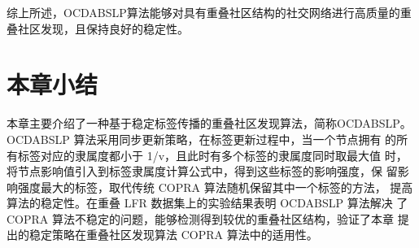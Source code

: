 综上所述，OCDABSLP算法能够对具有重叠社区结构的社交网络进行高质量的重叠社区发现，且保持良好的稳定性。







\section{本章小结}
本章主要介绍了一种基于稳定标签传播的重叠社区发现算法，简称OCDABSLP。OCDABSLP 算法采用同步更新策略，在标签更新过程中，当一个节点拥有
的所有标签对应的隶属度都小于 1/v，且此时有多个标签的隶属度同时取最大值
时，将节点影响值引入到标签隶属度计算公式中，得到这些标签的影响强度，保
留影响强度最大的标签，取代传统 COPRA 算法随机保留其中一个标签的方法，
提高算法的稳定性。在重叠 LFR 数据集上的实验结果表明 OCDABSLP 算法解决
了 COPRA 算法不稳定的问题，能够检测得到较优的重叠社区结构，验证了本章
提出的稳定策略在重叠社区发现算法 COPRA 算法中的适用性。